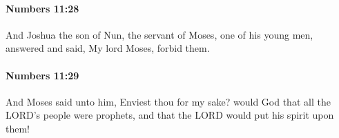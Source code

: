 		\paragraph{Numbers 11:28} %
			\label{NUMBERS-11-28}

			And Joshua the son of Nun, the servant of Moses, one of his young men, answered and said, My lord Moses, forbid them.


		\paragraph{Numbers 11:29} %
			\label{NUMBERS-11-29}

			And Moses said unto him, Enviest thou for my sake? would God that all the LORD’s people were prophets, and that the LORD would put his spirit upon them!


